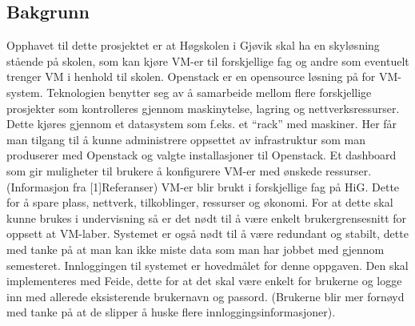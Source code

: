 \documentclass[12pt,a4paper]{article}
\begin{document}
\subsection{Bakgrunn}
Opphavet til dette prosjektet er at Høgskolen i Gjøvik skal ha en skyløsning stående på skolen, som kan kjøre VM-er til forskjellige fag og andre som eventuelt trenger VM i henhold til skolen. \newline \newline
Openstack er en opensource løsning på for VM-system. Teknologien benytter seg av å samarbeide mellom flere forskjellige prosjekter som kontrolleres gjennom maskinytelse, lagring og nettverksressurser. Dette kjøres gjennom et datasystem som f.eks. et “rack” med maskiner. Her får man tilgang til å kunne administrere oppsettet av infrastruktur som man produserer med Openstack og valgte installasjoner til Openstack. Et dashboard som gir muligheter til brukere å konfigurere VM-er med ønskede ressurser.
(Informasjon fra [1]Referanser) \newline \newline
VM-er blir brukt i forskjellige fag på HiG. Dette for å spare plass, nettverk, tilkoblinger, ressurser og økonomi. For at dette skal kunne brukes i undervisning så er det nødt til å være enkelt brukergrensesnitt for oppsett at VM-laber. Systemet er også nødt til å være redundant og stabilt, dette med tanke på at man kan ikke miste data som man har jobbet med gjennom semesteret. \newline \newline
Innloggingen til systemet er hovedmålet for denne oppgaven. Den skal implementeres med Feide, dette for at det skal være enkelt for brukerne og logge inn med allerede eksisterende brukernavn og passord. (Brukerne blir mer fornøyd med tanke på at de slipper å huske flere innloggingsinformasjoner).
\end{document}
